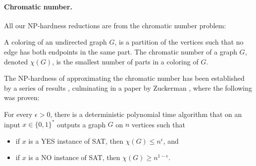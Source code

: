 \paragraph{Chromatic number.} All our NP-hardness reductions are from the chromatic number problem:
\begin{definition} A coloring of an undirected graph $G$, is a partition of the vertices such that no edge has both endpoints in the same part. The chromatic number of a graph $G$, denoted $\chi(G)$, is the smallest number of parts in a coloring of $G$.\end{definition}
The NP-hardness of approximating the chromatic number has been established by a series of results \cite{ref42,ref24,ref20}, culminating in a paper by Zuckerman \cite{ref65}, where the following was proven:
\begin{theorem}\label{thm:chromatic}
For every $\epsilon>0$, there is a deterministic polynomial time algorithm that on an input $x\in\{0,1\}^*$ outputs a graph $G$ on $n$ vertices such that
\begin{itemize}
\item if $x$ is a YES instance of SAT, then $\chi(G)\le n^\epsilon$, and
\item if $x$ is a NO instance of SAT, then $\chi(G)\ge n^{1-\epsilon}$.
\end{itemize}
\end{theorem}
